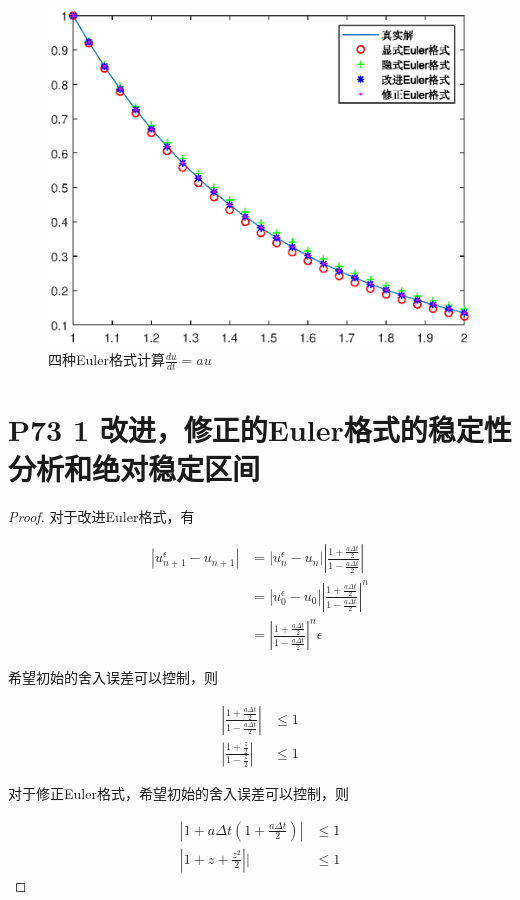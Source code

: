 \documentclass{article}%
\begin{document}
\begin{figure}
		\includegraphics[width=1\linewidth]{week4_2_1.eps}
		\caption{四种Euler格式计算$\frac{du}{dt} = au$}  
		\label{Fig:1}
\end{figure}

\section{P73 1 改进，修正的Euler格式的稳定性分析和绝对稳定区间}

\begin{proof}
	
	对于改进Euler格式，有
	
	\begin{align*}
	\left| u^{\epsilon}_{n+1}-u_{n+1} \right| & =\left| u^{\epsilon}_{n}-u_{n}\right|\left|\frac{1+\frac{a\Delta t}{2}}{1-\frac{a\Delta t}{2}}\right| \\
	&= \left| u^{\epsilon}_{0}-u_{0}\right|{\left| \frac{1+\frac{a\Delta t}{2}}{1-\frac{a\Delta t}{2}}  \right|}^{n} \\
	& ={\left| \frac{1+\frac{a\Delta t}{2}}{1-\frac{a\Delta t}{2}}  \right|}^{n}{\epsilon}
	\end{align*}
	
	希望初始的舍入误差可以控制，则
	
	\begin{align*}
	\left| \frac{1+\frac{a\Delta t}{2}}{1-\frac{a\Delta t}{2}}  \right| & \leq 1 \\
	\left| \frac{1+\frac{z}{2}}{1-\frac{z}{2}}  \right| & \leq 1
	\end{align*}

	对于修正Euler格式，希望初始的舍入误差可以控制，则
	
\begin{align*}
\left | 1+a\Delta t\left (1+\frac{a\Delta t}{2}\right ) \right |& \leq 1  \\
\left | 1+z+\frac{z^2}{2} \right | |& \leq 1 
\end{align*}
\end{proof}
\end{document}
